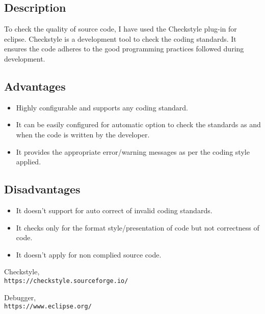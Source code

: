\documentclass[12pt]{report}
\begin{document}
\subsection{Description}
To check the quality of source code, I have used the Checkstyle plug-in for eclipse. Checkstyle is a development tool to check the coding standards. It ensures the code adheres to the good programming practices followed during development.

\subsection{Advantages}
\begin{itemize}
    \item Highly configurable and supports any coding standard.
    \item It can be easily configured for automatic option to check the standards as and when the code is written by the developer.
    \item It provides the appropriate error/warning messages as per the coding style applied.
\end{itemize}

\subsection{Disadvantages}
\begin{itemize}
    \item It doesn’t support for auto correct of invalid coding standards.
    \item It checks only for the format style/presentation of code  but not correctness of code.
    \item It doesn’t apply for non complied source code.
\end{itemize}

\begin{thebibliography}{9}
Checkstyle,
\\\texttt{https://checkstyle.sourceforge.io/}

Debugger,
\\\texttt{https://www.eclipse.org/}

\end{thebibliography}
\end{document}
